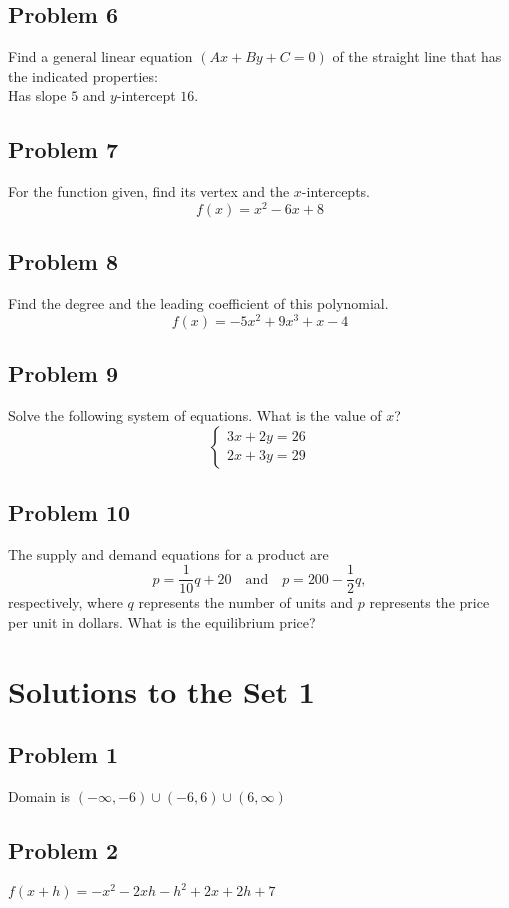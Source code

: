 \documentclass[12pt]{article}
\begin{document}
\subsection*{Problem 6}
Find a general linear equation \((Ax+By+C=0)\) of the straight line that has the indicated properties: \\[1ex]
Has slope \( 5 \) and \( y \)-intercept \( 16 \).

\subsection*{Problem 7}
For the function given, find its vertex and the \( x \)-intercepts.
\[f(x)=x^2-6x+8\]

\subsection*{Problem 8}
Find the degree and the leading coefficient of this polynomial.
\[f(x)=-5x^2+9x^3+x-4\]

\subsection*{Problem 9}
Solve the following system of equations. What is the value of 
\( x \)?
\[
\begin{cases}
3x + 2y = 26 \\
2x + 3y = 29
\end{cases}
\]


\subsection*{Problem 10}
The supply and demand equations for a product are 
\[
p = \dfrac{1}{10}q + 20 \quad \text{and} \quad p = 200 - \dfrac{1}{2}q,
\]
respectively, where \( q \) represents the number of units and \( p \) represents the price per unit in dollars. What is the equilibrium price?

\newpage
\section*{Solutions to the Set 1}
\subsection*{Problem 1}
Domain is \((-\infty,-6)\cup (-6,6)\cup (6,\infty)\)
\subsection*{Problem 2}
\(f(x+h)=-x^2-2xh-h^2+2x+2h+7\)
\end{document}

